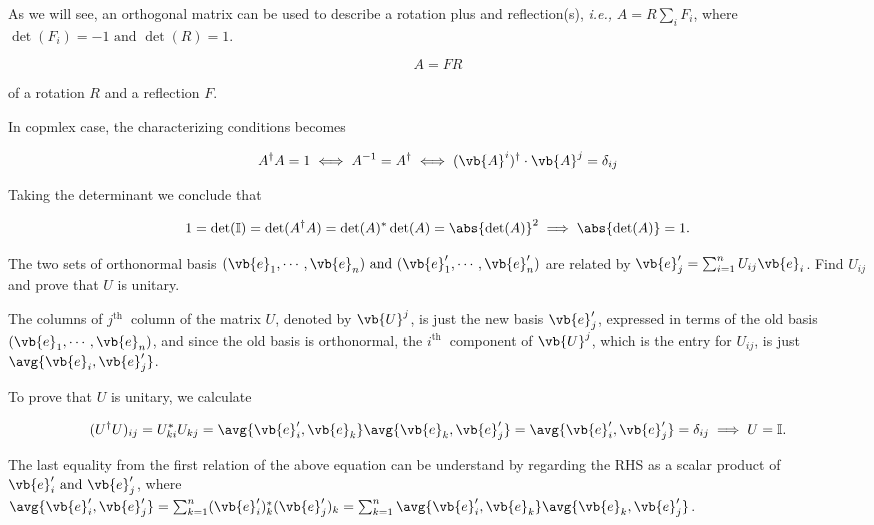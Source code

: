 \documentclass[a4paper,12pt]{report}
\begin{document}
As we will see, an orthogonal matrix can be used to describe a rotation plus and reflection(s), \textit{i.e.,} \(A = R\sum_{i}^{}F_{i}  \), where \(\det (F_{i} ) = -1 \text { and } \det (R) = 1\). 

\begin{equation}
    A = FR
\end{equation}

of a rotation \(R\) and a reflection \(F\). 

In copmlex case, the characterizing conditions becomes

\begin{equation}
    A^{\dagger} A = 1 \iff A^{-1} = A^{\dagger} \iff (\vb{A} ^{i} )^{\dagger} \cdot  \vb{A} ^{j} = \delta _{ij}
\end{equation}

Taking the determinant we conclude that 

\begin{equation}
    1 = \det (\mathbb{I}) = \det (A^{\dagger} A) = \det (A)^*\det (A) = \abs{\det (A)}^2 \implies \abs{\det (A)} = 1. 
\end{equation}

{The two sets of orthonormal basis \((\vb{e}_1, \cdots, \vb{e}_n ) \text { and } (\vb{e}'_1, \cdots, \vb{e}'_n )\) are related by \(\vb{e}' _{j} = \sum_{i=1}^{n} U_{ij}\vb{e} _{i}\). Find \(U_{ij} \) and prove that \(U\) is unitary.}
{The columns of \(j^{\text{th }} \) column of the matrix \(U\), denoted by \(\vb{U} ^{j} \), is just the new basis \(\vb{e}' _{j}  \), expressed in terms of the old basis \((\vb{e}_1, \cdots, \vb{e}_n )\), and since the old basis is orthonormal, the \(i^{\text{th }} \) component of \(\vb{U} ^{j} \), which is the entry for \(U_{ij} \), is just \(\avg{\vb{e} _{i}, \vb{e} '_{j}  } \). 

To prove that \(U\) is unitary, we calculate

\begin{equation}
    (U^{\dagger} U )_{ij} = U^*_{ki} U_{kj} = \avg{\vb{e} '_{i}, \vb{e} _{k} }\avg{\vb{e} _{k}, \vb{e} '_{j}  } = \avg{\vb{e} '_{i}, \vb{e} '_{j}  } = \delta _{ij} \implies U= \mathbb{I}.    
\end{equation}

The last equality from the first relation of the above equation can be understand by regarding the RHS as a scalar product of \(\vb{e} '_{i} \text { and } \vb{e} '_{j}  \), where \(\avg{\vb{e} '_{i}, \vb{e} '_{j}   } = \sum_{k=1}^{n} (\vb{e} '_{i} )^*_{k}(\vb{e} '_{j} )_{k} = \sum_{k=1}^{n} \avg{\vb{e} '_{i},\vb{e} _{k}  } \avg{\vb{e} _{k}, \vb{e} '_{j}  }    \).  
} 
\end{document}
